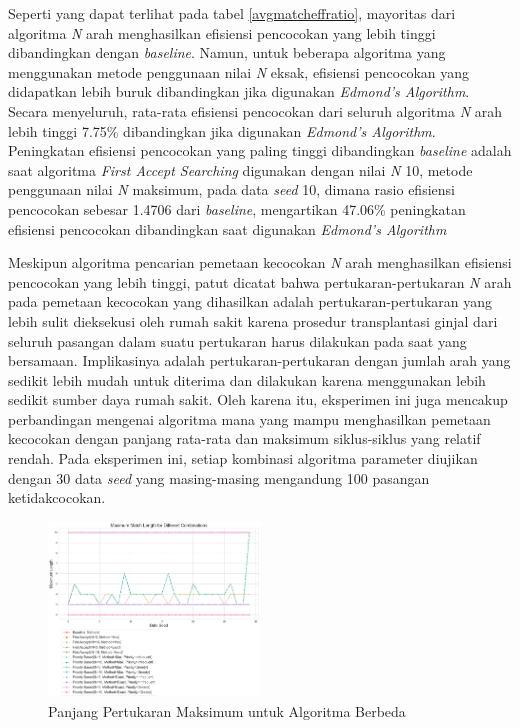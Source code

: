 \documentclass[conference]{IEEEtran}
\begin{document}
Seperti yang dapat terlihat pada tabel \ref{avgmatcheffratio}, mayoritas dari algoritma \textit{N} arah menghasilkan efisiensi
pencocokan yang lebih tinggi dibandingkan dengan \textit{baseline}. Namun, untuk beberapa algoritma yang menggunakan metode
penggunaan nilai \textit{N} eksak, efisiensi pencocokan yang didapatkan lebih buruk dibandingkan jika digunakan \textit{Edmond's Algorithm}.
Secara menyeluruh, rata-rata efisiensi pencocokan dari seluruh algoritma \textit{N} arah lebih tinggi 7.75\% dibandingkan jika
digunakan \textit{Edmond's Algorithm}. Peningkatan efisiensi pencocokan yang paling tinggi dibandingkan \textit{baseline} adalah saat
algoritma \textit{First Accept Searching} digunakan dengan nilai \textit{N} 10, metode penggunaan nilai \textit{N} maksimum, pada
data \textit{seed} 10, dimana rasio efisiensi pencocokan sebesar 1.4706 dari \textit{baseline}, mengartikan 47.06\% peningkatan
efisiensi pencocokan dibandingkan saat digunakan \textit{Edmond's Algorithm}

Meskipun algoritma pencarian pemetaan kecocokan \textit{N} arah menghasilkan efisiensi pencocokan yang lebih tinggi, patut dicatat
bahwa pertukaran-pertukaran \textit{N} arah pada pemetaan kecocokan yang dihasilkan adalah pertukaran-pertukaran yang lebih sulit
dieksekusi oleh rumah sakit karena prosedur transplantasi ginjal dari seluruh pasangan dalam suatu pertukaran harus dilakukan pada
saat yang bersamaan. Implikasinya adalah pertukaran-pertukaran dengan jumlah arah yang sedikit lebih mudah untuk diterima dan dilakukan
karena menggunakan lebih sedikit sumber daya rumah sakit. Oleh karena itu, eksperimen ini juga mencakup perbandingan mengenai algoritma
mana yang mampu menghasilkan pemetaan kecocokan dengan panjang rata-rata dan maksimum siklus-siklus yang relatif rendah. Pada eksperimen
ini, setiap kombinasi algoritma parameter diujikan dengan 30 data \textit{seed} yang masing-masing mengandung 100 pasangan ketidakcocokan. 

\begin{figure}[h]
   \includegraphics[width=0.5\textwidth]{images/maximum_match_length_for_different_combinations.png}
   \caption{Panjang Pertukaran Maksimum untuk Algoritma Berbeda}
   \label{figuremaxlength}
\end{figure}
\end{document}

